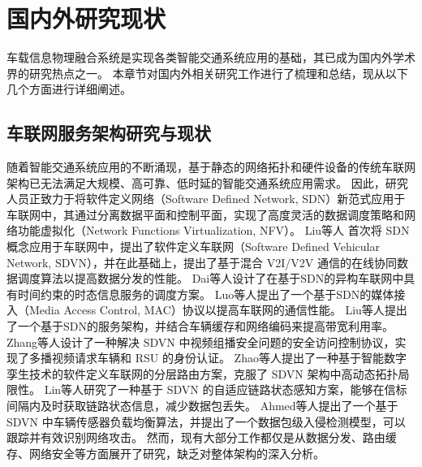 \section{国内外研究现状}\label{section 1-3}

车载信息物理融合系统是实现各类智能交通系统应用的基础，其已成为国内外学术界的研究热点之一。
本章节对国内外相关研究工作进行了梳理和总结，现从以下几个方面进行详细阐述。

\subsection{车联网服务架构研究与现状}

随着智能交通系统应用的不断涌现，基于静态的网络拓扑和硬件设备的传统车联网架构已无法满足大规模、高可靠、低时延的智能交通系统应用需求。
因此，研究人员正致力于将软件定义网络（Software Defined Network, SDN）新范式应用于车联网中，其通过分离数据平面和控制平面，实现了高度灵活的数据调度策略和网络功能虚拟化（Network Functions Virtualization, NFV）。
Liu等人 \cite{liu2016cooperative} 首次将 SDN 概念应用于车联网中，提出了软件定义车联网（Software Defined Vehicular Network, SDVN），并在此基础上，提出了基于混合 V2I/V2V 通信的在线协同数据调度算法以提高数据分发的性能。
Dai等人\cite{dai2018cooperative}设计了在基于SDN的异构车联网中具有时间约束的时态信息服务的调度方案。
Luo等人\cite{luo2018sdnmac}提出了一个基于SDN的媒体接入（Media Access Control, MAC）协议以提高车联网的通信性能。
Liu等人\cite{liu2018coding}提出了一个基于SDN的服务架构，并结合车辆缓存和网络编码来提高带宽利用率。
Zhang等人\cite{zhang2022ac-sdvn}设计了一种解决 SDVN 中视频组播安全问题的安全访问控制协议，实现了多播视频请求车辆和 RSU 的身份认证。
Zhao等人\cite{zhao2022elite}提出了一种基于智能数字孪生技术的软件定义车联网的分层路由方案，克服了 SDVN 架构中高动态拓扑局限性。
Lin等人\cite{lin2023alps}研究了一种基于 SDVN 的自适应链路状态感知方案，能够在信标间隔内及时获取链路状态信息，减少数据包丢失。
Ahmed等人\cite{ahmed2023deep}提出了一个基于 SDVN 中车辆传感器负载均衡算法，并提出了一个数据包级入侵检测模型，可以跟踪并有效识别网络攻击。
然而，现有大部分工作都仅是从数据分发、路由缓存、网络安全等方面展开了研究，缺乏对整体架构的深入分析。

